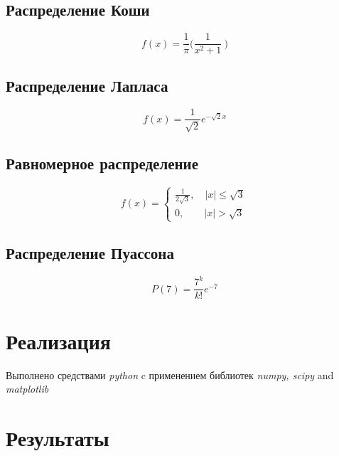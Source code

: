 \documentclass[12pt]{article}
\begin{document}
\subsection{Распределение Коши}

\begin{equation}
f(x)= \frac{1}{\pi}\bigg( \frac{1}{x^2 + 1}\ \bigg)
\end{equation}

\subsection{Распределение Лапласа}

\begin{equation} 
f(x)= \frac{1}{\sqrt{2}}e^{-\sqrt{2}x}
\end{equation}

\subsection{Равномерное распределение}

\begin{equation}
      f(x) = 
      \begin{cases}
      \frac{1}{2\sqrt{3}}, \quad |x| \leq \sqrt{3} \\
      0, \qquad |x| > \sqrt{3}
      \end{cases}
\end{equation}

\subsection{Распределение Пуассона}

\begin{equation}
P(7) = \frac{7^k}{k!}e^{-7}
\end{equation}

\pagebreak

\section{Реализация}
Выполнено средствами \textit{python} c применением библиотек \textit{numpy, scipy} and \textit{matplotlib}

\section{Результаты}
\end{document}
